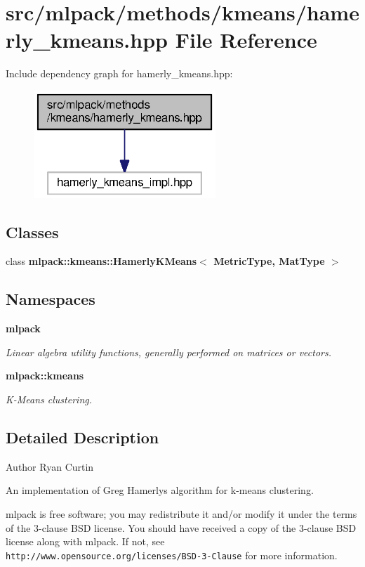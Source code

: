 \section{src/mlpack/methods/kmeans/hamerly\+\_\+kmeans.hpp File Reference}
\label{hamerly__kmeans_8hpp}
Include dependency graph for hamerly\+\_\+kmeans.\+hpp\+:
\nopagebreak
\begin{figure}[H]
\begin{center}
\leavevmode
\includegraphics[width=194pt]{hamerly__kmeans_8hpp__incl}
\end{center}
\end{figure}
\subsection*{Classes}
\begin{DoxyCompactItemize}
\item 
class {\bf mlpack\+::kmeans\+::\+Hamerly\+K\+Means$<$ Metric\+Type, Mat\+Type $>$}
\end{DoxyCompactItemize}
\subsection*{Namespaces}
\begin{DoxyCompactItemize}
\item 
 {\bf mlpack}
\begin{DoxyCompactList}\small\item\em Linear algebra utility functions, generally performed on matrices or vectors. \end{DoxyCompactList}\item 
 {\bf mlpack\+::kmeans}
\begin{DoxyCompactList}\small\item\em K-\/\+Means clustering. \end{DoxyCompactList}\end{DoxyCompactItemize}


\subsection{Detailed Description}
\begin{DoxyAuthor}{Author}
Ryan Curtin
\end{DoxyAuthor}
An implementation of Greg Hamerly\textquotesingle{}s algorithm for k-\/means clustering.

mlpack is free software; you may redistribute it and/or modify it under the terms of the 3-\/clause B\+SD license. You should have received a copy of the 3-\/clause B\+SD license along with mlpack. If not, see {\tt http\+://www.\+opensource.\+org/licenses/\+B\+S\+D-\/3-\/\+Clause} for more information. 
